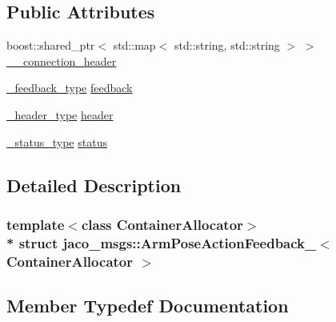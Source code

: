 \subsection*{Public Attributes}
\begin{DoxyCompactItemize}
\item 
boost\+::shared\+\_\+ptr$<$ std\+::map$<$ std\+::string, std\+::string $>$ $>$ \hyperlink{structjaco__msgs_1_1ArmPoseActionFeedback___a5926651155af1b0644889987fabceac3}{\+\_\+\+\_\+connection\+\_\+header}
\item 
\hyperlink{structjaco__msgs_1_1ArmPoseActionFeedback___aeb40aa6cf61cdbbfc66dd06afad5966f}{\+\_\+feedback\+\_\+type} \hyperlink{structjaco__msgs_1_1ArmPoseActionFeedback___a27069f4ef80d8c3546354691d3511059}{feedback}
\item 
\hyperlink{structjaco__msgs_1_1ArmPoseActionFeedback___a69a211a498e91546eee88514ed284ebb}{\+\_\+header\+\_\+type} \hyperlink{structjaco__msgs_1_1ArmPoseActionFeedback___af09503192cc1120085e2f8ef58ab0dbb}{header}
\item 
\hyperlink{structjaco__msgs_1_1ArmPoseActionFeedback___ad4f8a93bf87c5fd004a8523ca2182c2c}{\+\_\+status\+\_\+type} \hyperlink{structjaco__msgs_1_1ArmPoseActionFeedback___a386a2bed5a7ad4dcd6b6135799f9882d}{status}
\end{DoxyCompactItemize}


\subsection{Detailed Description}
\subsubsection*{template$<$class Container\+Allocator$>$\\*
struct jaco\+\_\+msgs\+::\+Arm\+Pose\+Action\+Feedback\+\_\+$<$ Container\+Allocator $>$}



\subsection{Member Typedef Documentation}
